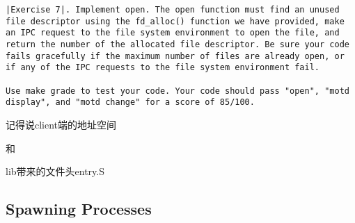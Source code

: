 \documentclass{article}
\begin{document}
\begin{CJK*}{UTF8}{gkai}
	
\begin{lstlisting}[style=exercise]
|Exercise 7|. Implement open. The open function must find an unused file descriptor using the fd_alloc() function we have provided, make an IPC request to the file system environment to open the file, and return the number of the allocated file descriptor. Be sure your code fails gracefully if the maximum number of files are already open, or if any of the IPC requests to the file system environment fail.

Use make grade to test your code. Your code should pass "open", "motd display", and "motd change" for a score of 85/100.
\end{lstlisting}

记得说client端的地址空间

和

lib带来的文件头entry.S
\subsection{Spawning Processes}

\begin{lstlisting}[style=ccode, title={\scriptsize \ttfamily \bfseries kern/: ()}]
\end{lstlisting}


\begin{lstlisting}[style=ccode, title={\scriptsize \ttfamily \bfseries kern/: ()}]
\end{lstlisting}

\begin{lstlisting}[style=acode, title={\scriptsize \ttfamily \bfseries kern/: ()}]
\end{lstlisting}

\begin{lstlisting}[style=console]
\end{lstlisting}

\begin{lstlisting}[style=exercise]
\end{lstlisting}

\clearpage

\end{CJK*}
\end{document}
